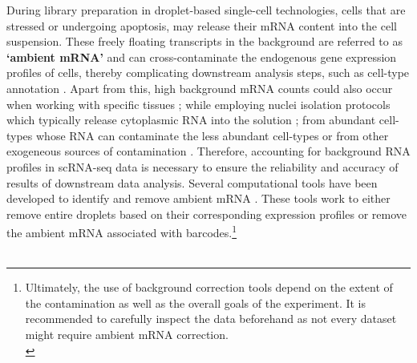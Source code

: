 During library preparation in droplet-based single-cell technologies, cells that are stressed or undergoing apoptosis, may release their mRNA content into the cell suspension. These freely floating transcripts in the background are referred to as \textbf{‘ambient mRNA’} and can cross-contaminate the endogenous gene expression profiles of cells, thereby complicating downstream analysis steps, such as cell-type annotation \textbf{\cite{yang_decontamination_2020}}. Apart from this, high background mRNA counts could also occur when working with specific tissues \textbf{\cite{10x_genomics_introduction_nodate,madissoon_scrna-seq_2019}}; while employing nuclei isolation protocols which typically release cytoplasmic RNA into the solution \textbf{\cite{10x_genomics_introduction_nodate}}; from abundant cell-types whose RNA can contaminate the less abundant cell-types \textbf{\cite{10x_genomics_introduction_nodate,caglayan_neuronal_2022}} or from other exogeneous sources of contamination \textbf{\cite{10x_genomics_introduction_nodate}}. Therefore, accounting for background RNA profiles in scRNA-seq data is necessary to ensure the reliability and accuracy of results of downstream data analysis. Several computational tools have been developed to identify and remove ambient mRNA \textbf{\cite{yang_decontamination_2020,young_soupx_2020,fleming_unsupervised_2023,yan_emptynn_2021,alvarez_enhancing_2020,muskovic_dropletqc_2021}}. These tools work to either remove entire droplets based on their corresponding expression profiles or remove the ambient mRNA associated with barcodes.\footnote{Ultimately, the use of background correction tools depend on the extent of the contamination as well as the overall goals of the experiment. It is recommended to carefully inspect the data beforehand as not every dataset might require ambient mRNA correction.\\}\\\\
